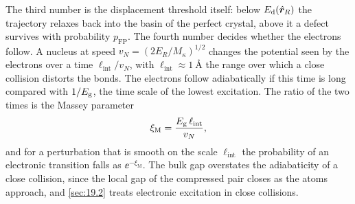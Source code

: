 The third number is the displacement threshold itself: below $E_{\mathrm{d}}(\hat{\bm{r}}_R)$ the trajectory relaxes back into the basin of the perfect crystal, above it a defect survives with probability $p_{\mathrm{FP}}$. The fourth number decides whether the electrons follow. A nucleus at speed $v_N = (2E_R/M_\kappa)^{1/2}$ changes the potential seen by the electrons over a time $\ell_{\mathrm{int}}/v_N$, with $\ell_{\mathrm{int}} \approx \SI{1}{\angstrom}$ the range over which a close collision distorts the bonds. The electrons follow adiabatically if this time is long compared with $1/E_{\mathrm{g}}$, the time scale of the lowest excitation. The ratio of the two times is the Massey parameter
\begin{equation*}
  \xi_{\mathrm{M}} = \frac{E_{\mathrm{g}}\,\ell_{\mathrm{int}}}{v_N} ,
\end{equation*}
and for a perturbation that is smooth on the scale $\ell_{\mathrm{int}}$ the probability of an electronic transition falls as $\ee^{-\xi_{\mathrm{M}}}$. The bulk gap overstates the adiabaticity of a close collision, since the local gap of the compressed pair closes as the atoms approach, and \cref{sec:19.2} treats electronic excitation in close collisions.

